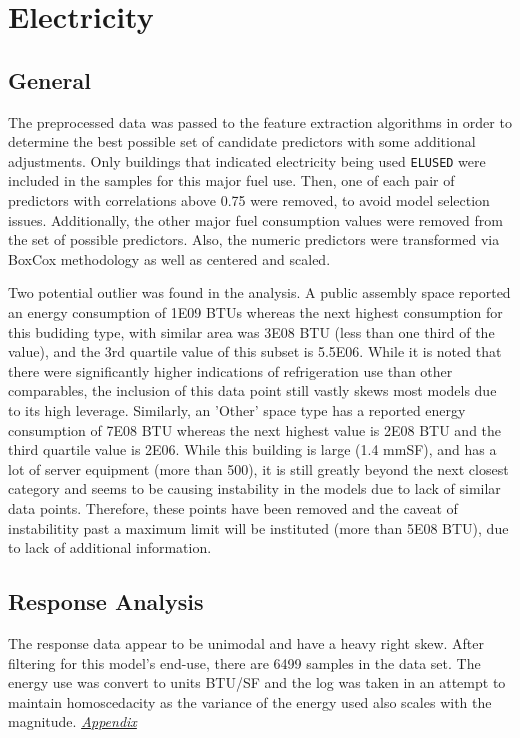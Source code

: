 \section{Electricity}
\label{sec:electricity}

\subsection{General}

The preprocessed data was passed to the feature extraction algorithms in order to determine the best possible set of candidate predictors with some additional adjustments.  Only buildings that indicated electricity being used \lstinline{ELUSED} were included in the samples for this major fuel use.  Then, one of each pair of predictors with correlations above 0.75 were removed, to avoid model selection issues. Additionally, the other major fuel consumption values were removed from the set of possible predictors.  Also, the numeric predictors were transformed via BoxCox methodology as well as centered and scaled.

Two potential outlier was found in the analysis. A public assembly space reported an energy consumption of 1E09 BTUs whereas the next highest consumption for this budiding type, with similar area was 3E08 BTU (less than one third of the value), and the 3rd quartile value of this subset is 5.5E06.  While it is noted that there were significantly higher indications of refrigeration use than other comparables, the inclusion of this data point still vastly skews most models due to its high leverage.  Similarly, an 'Other' space type has a reported energy consumption of 7E08 BTU whereas the next highest value is 2E08 BTU and the third quartile value is 2E06.  While this building is large (1.4 mmSF), and has a lot of server equipment (more than 500), it is still greatly beyond the next closest category and seems to be causing instability in the models due to lack of similar data points.  Therefore, these points have been removed and the caveat of instabilitity past a maximum limit will be instituted (more than 5E08 BTU), due to lack of additional information.

\subsection{Response Analysis}

The response data appear to be unimodal and have a heavy right skew.  After filtering for this model's end-use, there are 6499 samples in the data set.  The energy use was convert to units BTU/SF and the log was taken in an attempt to maintain homoscedacity as the variance of the energy used also scales with the magnitude.  \textit{\hyperref[appendix:electricity:response]{Appendix}}

